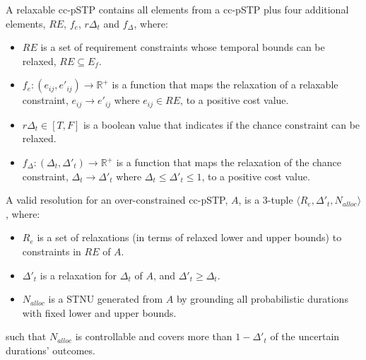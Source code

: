 \documentclass[jair,twoside,11pt,theapa]{article}
\begin{document}
\begin{mydef}
	
	A relaxable cc-pSTP contains all elements from a cc-pSTP plus four additional
	elements, $RE$, $f_e$, $r\Delta_t$ and $f_\Delta$, where: 
	
	\begin{itemize}
		
		\item $RE$ is a set of requirement constraints whose temporal bounds can be
		relaxed, $RE\subseteq E_f$.
		
		\item $f_{e}:(e_{ij},e'_{ij})\rightarrow \mathbb{R}^+$ is a function that
		maps the relaxation of a relaxable constraint, $e_{ij}\rightarrow e'_{ij}$
		where
		$e_{ij}\in RE$, to a positive cost value. 
		
		\item $r\Delta_t\in [T,F]$ is a boolean value that indicates if the chance
		constraint can be relaxed.
		
		\item $f_\Delta:(\Delta_t,\Delta'_t)\rightarrow \mathbb{R}^+$ is a function
		that maps the relaxation of the chance constraint, $\Delta_t\rightarrow
		\Delta'_t$ where $\Delta_t\leq \Delta'_t\leq 1$, to a positive cost value.
		
	\end{itemize}
	
\end{mydef}


\begin{mydef}
	
	A valid resolution for an over-constrained cc-pSTP, $A$, is a 3-tuple $\langle
	R_e,\Delta'_t, N_{alloc}\rangle$, where:
	
	\begin{itemize}
		
		\item $R_e$ is a set of relaxations (in terms of relaxed lower and upper
		bounds) to constraints in $RE$ of $A$. 
		
		\item $\Delta'_t$ is a relaxation for $\Delta_t$ of $A$,
		and $\Delta'_t \geq \Delta_t$.
		
		\item $N_{alloc}$ is a STNU generated from $A$ by grounding all probabilistic
		durations with fixed lower and upper bounds. 
		
	\end{itemize}
	
	such that $N_{alloc}$ is  controllable and covers more than
	$1-\Delta'_t$ of the uncertain durations' outcomes.
	
\end{mydef}
\end{document}
